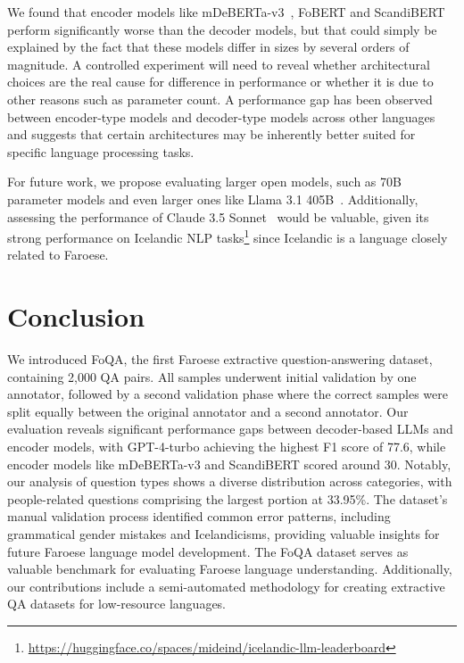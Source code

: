 \documentclass[11pt]{article}
\begin{document}
We found that encoder models like mDeBERTa-v3~\cite{he2021debertav3, he2021deberta},
FoBERT and ScandiBERT~\cite{snaebjarnarson-einarsson-2022-cross} perform significantly
worse than the decoder models, but that could simply be explained by the fact that these
models differ in sizes by several orders of magnitude. A controlled experiment will need
to reveal whether architectural choices are the real cause for difference in performance
or whether it is due to other reasons such as parameter count. A performance gap has
been observed between encoder-type models and decoder-type models across other languages
and \cite{nielsen2024encoder} suggests that certain architectures may be inherently
better suited for specific language processing tasks.

For future work, we propose evaluating larger open models, such as 70B parameter models
and even larger ones like Llama 3.1 405B~\cite{dubey2024llama3herdmodels}. Additionally,
assessing the performance of Claude 3.5 Sonnet~\cite{claude_sonnet_3_5} would be
valuable, given its strong performance on Icelandic NLP
tasks\footnote{\url{https://huggingface.co/spaces/mideind/icelandic-llm-leaderboard}}
since Icelandic is a language closely related to Faroese.


\section{Conclusion}
\label{sec:conclusion}

We introduced FoQA, the first Faroese extractive question-answering dataset, containing
2,000 QA pairs. All samples underwent initial validation by one annotator, followed by a
second validation phase where the correct samples were split equally between the
original annotator and a second annotator. Our evaluation reveals significant
performance gaps between decoder-based LLMs and encoder models, with GPT-4-turbo
achieving the highest F1 score of 77.6, while encoder models like mDeBERTa-v3 and
ScandiBERT scored around 30. Notably, our analysis of question types shows a diverse
distribution across categories, with people-related questions comprising the largest
portion at 33.95\%. The dataset's manual validation process identified common error
patterns, including grammatical gender mistakes and Icelandicisms, providing valuable
insights for future Faroese language model development. The FoQA dataset serves as
valuable benchmark for evaluating Faroese language understanding. Additionally, our
contributions include a semi-automated methodology for creating extractive QA datasets
for low-resource languages.
\end{document}
